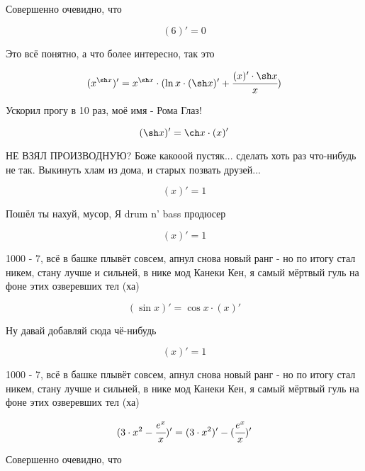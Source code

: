 Совершенно очевидно, что


\begin{dmath}
( 6 )' = 0
\end{dmath}


Это всё понятно, а что более интересно, так это


\begin{dmath}
({ x } ^ { \sh  x })' = { x } ^ { \sh  x } \cdot ( \ln  x  \cdot ( \sh  x )' +  \cfrac {( x )' \cdot  \sh  x }{ x })
\end{dmath}


Ускорил прогу в 10 раз, моё имя - Рома Глаз!


\begin{dmath}
( \sh  x )' =  \ch  x  \cdot ( x )'
\end{dmath}


НЕ ВЗЯЛ ПРОИЗВОДНУЮ? Боже какооой пустяк... сделать хоть раз что-нибудь не так. Выкинуть хлам из дома, и старых позвать друзей...


\begin{dmath}
( x )' = 1
\end{dmath}


Пошёл ты нахуй, мусор, Я drum n' bass продюсер


\begin{dmath}
( x )' = 1
\end{dmath}


1000 - 7, всё в башке плывёт совсем, апнул снова новый ранг - но по итогу стал никем, стану лучше и сильней, в нике мод Канеки Кен, я самый мёртвый гуль на фоне этих озверевших тел (ха)


\begin{dmath}
( \sin  x )' =  \cos  x  \cdot ( x )'
\end{dmath}


Ну давай добавляй сюда чё-нибудь


\begin{dmath}
( x )' = 1
\end{dmath}


1000 - 7, всё в башке плывёт совсем, апнул снова новый ранг - но по итогу стал никем, стану лучше и сильней, в нике мод Канеки Кен, я самый мёртвый гуль на фоне этих озверевших тел (ха)


\begin{dmath}
({{ 3 } \cdot {{ x } ^ { 2 }}} - { \cfrac {{ e } ^ { x }}{ x }})' = ({ 3 } \cdot {{ x } ^ { 2 }})' - ( \cfrac {{ e } ^ { x }}{ x })'
\end{dmath}


Совершенно очевидно, что


